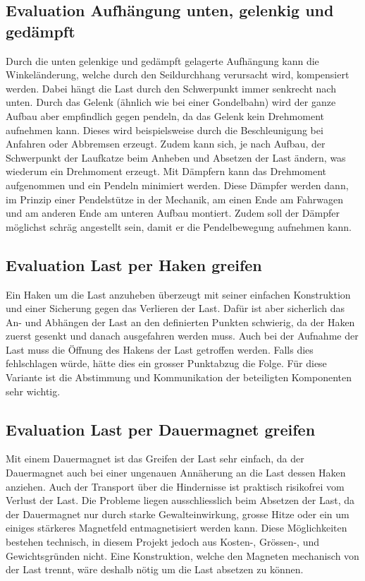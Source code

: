 \documentclass[a4paper]{report}
\begin{document}
\subsection{Evaluation Aufhängung unten, gelenkig und gedämpft}
\label{app:ssec:EvalAufhangUnten}
Durch die unten gelenkige und gedämpft gelagerte Aufhängung kann die Winkeländerung, welche durch den Seildurchhang verursacht wird, kompensiert werden. Dabei hängt die Last durch den Schwerpunkt immer senkrecht nach unten. Durch das Gelenk (ähnlich wie bei einer Gondelbahn) wird der ganze Aufbau aber empfindlich gegen pendeln, da das Gelenk kein Drehmoment aufnehmen kann. Dieses wird beispielsweise durch die Beschleunigung bei Anfahren oder Abbremsen erzeugt. Zudem kann sich, je nach Aufbau, der Schwerpunkt der Laufkatze beim Anheben und Absetzen der Last ändern, was wiederum ein Drehmoment erzeugt. Mit Dämpfern kann das Drehmoment aufgenommen und ein Pendeln minimiert werden. Diese Dämpfer werden dann, im Prinzip einer Pendelstütze in der Mechanik, am einen Ende am Fahrwagen und am anderen Ende am unteren Aufbau montiert. Zudem soll der Dämpfer möglichst schräg angestellt sein, damit er die Pendelbewegung aufnehmen kann.

\subsection{Evaluation Last per Haken greifen}
\label{app:ssec:EvalLastHaken}
Ein Haken um die Last anzuheben überzeugt mit seiner einfachen Konstruktion und einer Sicherung gegen das Verlieren der Last. Dafür ist aber sicherlich das An- und Abhängen der Last an den definierten Punkten schwierig, da der Haken zuerst gesenkt und danach ausgefahren werden muss. Auch bei der Aufnahme der Last muss die Öffnung des Hakens der Last getroffen werden. Falls dies fehlschlagen würde, hätte dies ein grosser Punktabzug die Folge. Für diese Variante ist die Abstimmung und Kommunikation der beteiligten Komponenten sehr wichtig.

\subsection{Evaluation Last per Dauermagnet greifen}
\label{app:ssec:EvalLastMagnet}
Mit einem Dauermagnet ist das Greifen der Last sehr einfach, da der Dauermagnet auch bei einer ungenauen Annäherung an die Last dessen Haken anziehen. Auch der Transport über die Hindernisse ist praktisch risikofrei vom Verlust der Last. Die Probleme liegen ausschliesslich beim Absetzen der Last, da der Dauermagnet nur durch starke Gewalteinwirkung, grosse Hitze oder ein um einiges stärkeres Magnetfeld entmagnetisiert werden kann. Diese Möglichkeiten bestehen technisch, in diesem Projekt jedoch aus Kosten-, Grössen-, und Gewichtsgründen nicht. Eine Konstruktion, welche den Magneten mechanisch von der Last trennt, wäre deshalb nötig um die Last absetzen zu können.
\end{document}

